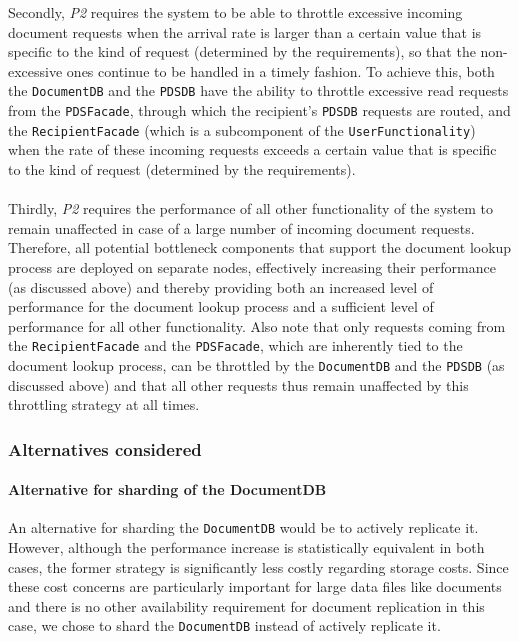 \documentclass[a4paper,10pt]{article}
\begin{document}
Secondly, \textit{P2} requires the system to be able to throttle excessive incoming document requests when the arrival rate is larger than a certain value that is specific to the kind of request (determined by the requirements), so that the non-excessive ones continue to be handled in a timely fashion. To achieve this, both the \texttt{DocumentDB} and the \texttt{PDSDB} have the ability to throttle excessive read requests from the \texttt{PDSFacade}, through which the recipient's \texttt{PDSDB} requests are routed, and the \texttt{RecipientFacade} (which is a subcomponent of the \texttt{UserFunctionality}) when the rate of these incoming requests exceeds a certain value that is specific to the kind of request (determined by the requirements).\\\\
Thirdly, \textit{P2} requires the performance of all other functionality of the system to remain unaffected in case of a large number of incoming document requests. Therefore, all potential bottleneck components that support the document lookup process are deployed on separate nodes, effectively increasing their performance (as discussed above) and thereby providing both an increased level of performance for the document lookup process and a sufficient level of performance for all other functionality. Also note that only requests coming from the \texttt{RecipientFacade} and the \texttt{PDSFacade}, which are inherently tied to the document lookup process, can be throttled by the \texttt{DocumentDB} and the \texttt{PDSDB} (as discussed above) and that all other requests thus remain unaffected by this throttling strategy at all times.
\subsubsection*{Alternatives considered}
\paragraph{Alternative for sharding of the DocumentDB}
An alternative for sharding the \texttt{DocumentDB} would be to actively replicate it. However, although the performance increase is statistically equivalent in both cases, the former strategy is significantly less costly regarding storage costs. Since these cost concerns are particularly important for large data files like documents and there is no other availability requirement for document replication in this case, we chose to shard the \texttt{DocumentDB} instead of actively replicate it.
\end{document}
